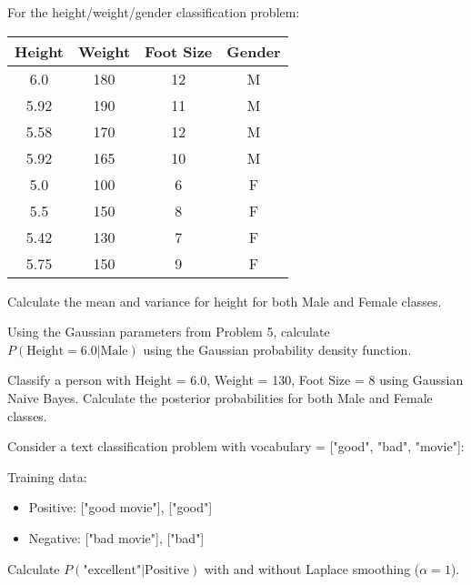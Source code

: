 \documentclass{article}
\newcounter{exercise}
\begin{document}
\begin{tcolorbox}[colback=gray!5!white,colframe=gray!75!black,title=Problem \stepcounter{exercise}: Gaussian Naive Bayes Setup]

For the height/weight/gender classification problem:

\begin{center}
\begin{tabular}{|c|c|c|c|}
\hline
Height & Weight & Foot Size & Gender \\
\hline
6.0 & 180 & 12 & M \\
5.92 & 190 & 11 & M \\
5.58 & 170 & 12 & M \\
5.92 & 165 & 10 & M \\
5.0 & 100 & 6 & F \\
5.5 & 150 & 8 & F \\
5.42 & 130 & 7 & F \\
5.75 & 150 & 9 & F \\
\hline
\end{tabular}
\end{center}

Calculate the mean and variance for height for both Male and Female classes.
\end{tcolorbox}

\begin{tcolorbox}[colback=gray!5!white,colframe=gray!75!black,title=Problem \stepcounter{exercise}: Gaussian Probability Calculation]

Using the Gaussian parameters from Problem 5, calculate $P(\text{Height} = 6.0|\text{Male})$ using the Gaussian probability density function.
\end{tcolorbox}

\begin{tcolorbox}[colback=gray!5!white,colframe=gray!75!black,title=Problem \stepcounter{exercise}: Complete Gaussian Classification]

Classify a person with Height = 6.0, Weight = 130, Foot Size = 8 using Gaussian Naive Bayes. Calculate the posterior probabilities for both Male and Female classes.
\end{tcolorbox}

\begin{tcolorbox}[colback=gray!5!white,colframe=gray!75!black,title=Problem \stepcounter{exercise}: Laplace Smoothing]

Consider a text classification problem with vocabulary = ["good", "bad", "movie"]:

Training data:
\begin{itemize}
    \item Positive: ["good movie"], ["good"]
    \item Negative: ["bad movie"], ["bad"]
\end{itemize}

Calculate $P(\text{"excellent"}|\text{Positive})$ with and without Laplace smoothing ($\alpha = 1$).
\end{tcolorbox}
\end{document}
